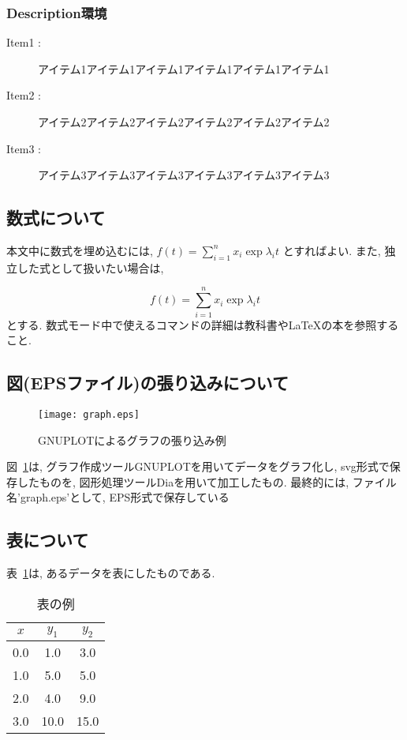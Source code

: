 \documentclass{jarticle}
\begin{document}
\subsubsection{Description環境}
%
\begin{description}

\item[Item1 : ] アイテム1アイテム1アイテム1アイテム1アイテム1アイテム1

\item[Item2 : ] アイテム2アイテム2アイテム2アイテム2アイテム2アイテム2

\item[Item3 : ] アイテム3アイテム3アイテム3アイテム3アイテム3アイテム3

\end{description}

\subsection{数式について}
%
本文中に数式を埋め込むには, $f(t) = \sum_{i=1}^{n} x_{i} \exp \lambda_{i} t$
とすればよい. 
また, 独立した式として扱いたい場合は, 

\begin{equation}
f(t) = \sum_{i=1}^{n} x_{i} \exp \lambda_{i} t
\end{equation}
%
とする. 数式モード中で使えるコマンドの詳細は教科書や{\LaTeX}の本を参照すること. 

\subsection{図(EPSファイル)の張り込みについて}
%
\begin{figure}
\begin{center}
\texttt{[image: graph.eps]}
\caption{GNUPLOTによるグラフの張り込み例}
\label{fig:graph}
\end{center}
\end{figure}

図~\ref{fig:graph}は, グラフ作成ツールGNUPLOTを用いてデータをグラフ化し, 
svg形式で保存したものを, 図形処理ツールDiaを用いて加工したもの. 
最終的には, ファイル名'graph.eps'として, EPS形式で保存している

\subsection{表について}
%
表~\ref{table:table1}は, あるデータを表にしたものである. 

\begin{table}
\caption{表の例}
\label{table:table1}
\begin{center}
\begin{tabular}{|c|c|c|}\hline
$x$ & $y_{1}$ & $y_{2}$ \\ \hline
0.0 & 1.0 & 3.0 \\ \hline
1.0 & 5.0 & 5.0 \\ \hline
2.0 & 4.0 & 9.0 \\ \hline
3.0 & 10.0 & 15.0 \\\hline
\end{tabular}
\end{center}
\end{table}
\end{document}
